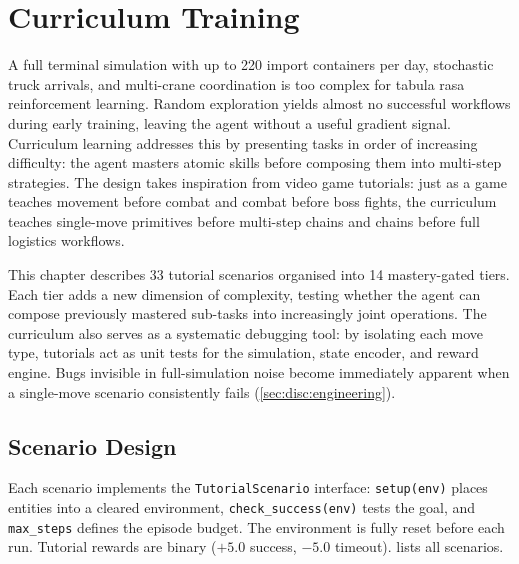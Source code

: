 \chapter{Curriculum Training}
\label{ch:curriculum}

A full terminal simulation with up to 220 import containers per day, stochastic truck arrivals, and multi-crane coordination is too complex for tabula rasa reinforcement learning. Random exploration yields almost no successful workflows during early training, leaving the agent without a useful gradient signal. Curriculum learning \cite{bengio2009curriculum} addresses this by presenting tasks in order of increasing difficulty: the agent masters atomic skills before composing them into multi-step strategies. The design takes inspiration from video game tutorials: just as a game teaches movement before combat and combat before boss fights, the curriculum teaches single-move primitives before multi-step chains and chains before full logistics workflows.

This chapter describes 33 tutorial scenarios organised into 14 mastery-gated tiers. Each tier adds a new dimension of complexity, testing whether the agent can compose previously mastered sub-tasks into increasingly joint operations. The curriculum also serves as a systematic debugging tool: by isolating each move type, tutorials act as unit tests for the simulation, state encoder, and reward engine. Bugs invisible in full-simulation noise become immediately apparent when a single-move scenario consistently fails (\cref{sec:disc:engineering}).

\section{Scenario Design}
\label{sec:curr:scenarios}

Each scenario implements the \texttt{TutorialScenario} interface: \texttt{setup(env)} places entities into a cleared environment, \texttt{check\_success(env)} tests the goal, and \texttt{max\_steps} defines the episode budget. The environment is fully reset before each run. Tutorial rewards are binary ($+5.0$ success, $-5.0$ timeout).  lists all scenarios.

